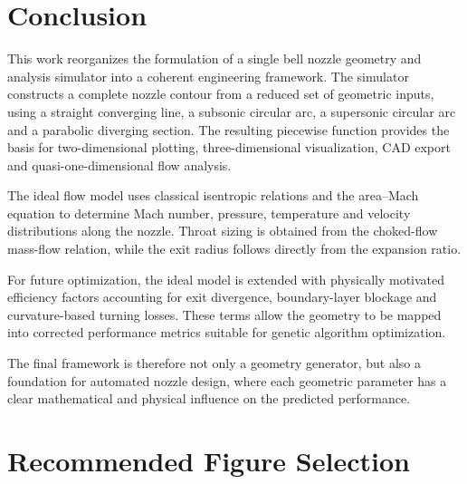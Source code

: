 \documentclass[11pt,a4paper]{article}
\begin{document}
\section{Conclusion}

This work reorganizes the formulation of a single bell nozzle geometry and analysis simulator into a coherent engineering framework. The simulator constructs a complete nozzle contour from a reduced set of geometric inputs, using a straight converging line, a subsonic circular arc, a supersonic circular arc and a parabolic diverging section. The resulting piecewise function provides the basis for two-dimensional plotting, three-dimensional visualization, CAD export and quasi-one-dimensional flow analysis.

The ideal flow model uses classical isentropic relations and the area--Mach equation to determine Mach number, pressure, temperature and velocity distributions along the nozzle. Throat sizing is obtained from the choked-flow mass-flow relation, while the exit radius follows directly from the expansion ratio.

For future optimization, the ideal model is extended with physically motivated efficiency factors accounting for exit divergence, boundary-layer blockage and curvature-based turning losses. These terms allow the geometry to be mapped into corrected performance metrics suitable for genetic algorithm optimization.

The final framework is therefore not only a geometry generator, but also a foundation for automated nozzle design, where each geometric parameter has a clear mathematical and physical influence on the predicted performance.

\appendix
\section{Recommended Figure Selection}
\end{document}
